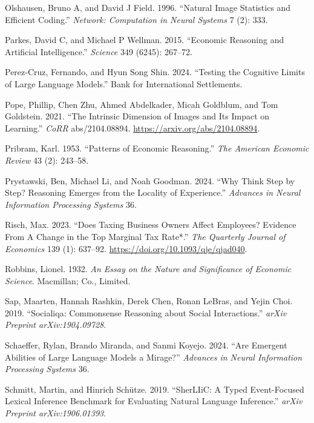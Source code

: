 \documentclass[
]{article}
\newlength{\cslhangindent}
\newenvironment{CSLReferences}[2] %
 {\begin{list}{}{%
  \setlength{\itemindent}{0pt}
  \setlength{\leftmargin}{0pt}
  \setlength{\parsep}{0pt}
  \ifodd #1
   \setlength{\leftmargin}{\cslhangindent}
   \setlength{\itemindent}{-1\cslhangindent}
  \fi
  \setlength{\itemsep}{#2\baselineskip}}}
 {\end{list}}
\theoremstyle{plain}
\theoremstyle{definition}
\theoremstyle{remark}
\begin{document}
\begin{CSLReferences}{1}{0}
Olshausen, Bruno A, and David J Field. 1996. {``Natural Image Statistics
and Efficient Coding.''} \emph{Network: Computation in Neural Systems} 7
(2): 333.

Parkes, David C, and Michael P Wellman. 2015. {``Economic Reasoning and
Artificial Intelligence.''} \emph{Science} 349 (6245): 267--72.

Perez-Cruz, Fernando, and Hyun Song Shin. 2024. {``Testing the Cognitive
Limits of Large Language Models.''} Bank for International Settlements.

Pope, Phillip, Chen Zhu, Ahmed Abdelkader, Micah Goldblum, and Tom
Goldstein. 2021. {``The Intrinsic Dimension of Images and Its Impact on
Learning.''} \emph{CoRR} abs/2104.08894.
\url{https://arxiv.org/abs/2104.08894}.

Pribram, Karl. 1953. {``Patterns of Economic Reasoning.''} \emph{The
American Economic Review} 43 (2): 243--58.

Prystawski, Ben, Michael Li, and Noah Goodman. 2024. {``Why Think Step
by Step? Reasoning Emerges from the Locality of Experience.''}
\emph{Advances in Neural Information Processing Systems} 36.

Risch, Max. 2023. {``{Does Taxing Business Owners Affect Employees?
Evidence From A Change in the Top Marginal Tax Rate*}.''} \emph{The
Quarterly Journal of Economics} 139 (1): 637--92.
\url{https://doi.org/10.1093/qje/qjad040}.

Robbins, Lionel. 1932. \emph{An Essay on the Nature and Significance of
Economic Science}. Macmillan; Co., Limited.

Sap, Maarten, Hannah Rashkin, Derek Chen, Ronan LeBras, and Yejin Choi.
2019. {``Socialiqa: Commonsense Reasoning about Social Interactions.''}
\emph{arXiv Preprint arXiv:1904.09728}.

Schaeffer, Rylan, Brando Miranda, and Sanmi Koyejo. 2024. {``Are
Emergent Abilities of Large Language Models a Mirage?''} \emph{Advances
in Neural Information Processing Systems} 36.

Schmitt, Martin, and Hinrich Schütze. 2019. {``SherLIiC: A Typed
Event-Focused Lexical Inference Benchmark for Evaluating Natural
Language Inference.''} \emph{arXiv Preprint arXiv:1906.01393}.


\end{CSLReferences}
\end{document}
